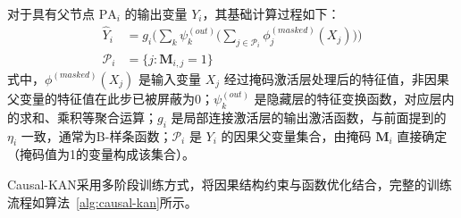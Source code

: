 对于具有父节点 $\mathrm{PA}_i$ 的输出变量 $Y_i$，其基础计算过程如下：
\begin{equation}
	\begin{split}
		\hat{Y}_i &= g_i \Big( \sum_k \psi_k^{(out)} \Big( \sum_{j \in \mathcal{P}_i} \phi_{j}^{(masked)}(X_j) \Big) \Big)\\
		\mathcal{P}_i &= \{j: \mathbf{M}_{i,j}=1\}
	\end{split}
\end{equation}
式中，$\phi^{(masked)}(X_j)$ 是输入变量 $X_j$ 经过掩码激活层处理后的特征值，非因果父变量的特征值在此步已被屏蔽为0；$\psi_k^{(out)}$ 是隐藏层的特征变换函数，对应层内的求和、乘积等聚合运算；$g_i$ 是局部连接激活层的输出激活函数，与前面提到的 $\eta_i$ 一致，通常为B-样条函数；$\mathcal{P}_i$ 是 $Y_i$ 的因果父变量集合，由掩码 $\mathbf{M}_i$ 直接确定（掩码值为1的变量构成该集合）。

\label{sec:training_algorithm}

Causal-KAN采用多阶段训练方式，将因果结构约束与函数优化结合，完整的训练流程如算法~\ref{alg:causal-kan}所示。

